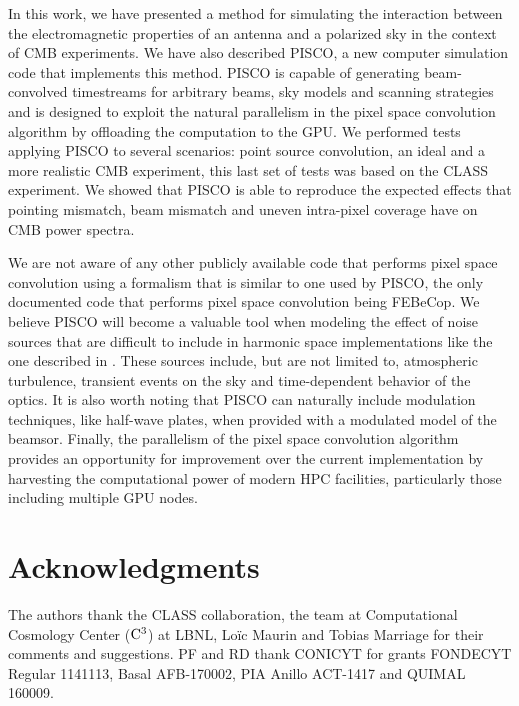 \documentclass[a4paper,11pt]{article}
\begin{document}
In this work, we have presented a method for simulating the interaction between the electromagnetic properties of an antenna and a polarized sky in the context of CMB experiments. We have also described PISCO, a new computer simulation code that implements this method. PISCO is capable of generating beam-convolved timestreams for arbitrary beams, sky models and scanning strategies and is designed to exploit the natural parallelism in the pixel space convolution algorithm by offloading the computation to the GPU. We performed tests applying PISCO to several scenarios: point source convolution, an ideal and a more realistic CMB experiment, this last set of tests was based on the CLASS experiment. We showed that PISCO is able to reproduce the expected effects that pointing mismatch, beam mismatch and uneven intra-pixel coverage have on CMB power spectra. 

We are not aware of any other publicly available code that performs pixel space convolution using a formalism that is similar to one used by PISCO, the only documented code that performs pixel space convolution being FEBeCop. We believe PISCO will become a valuable tool when modeling the effect of noise sources that are difficult to include in harmonic space implementations like the one described in \cite{2018arXiv180905034D}. These sources include, but are not limited to, atmospheric turbulence, transient events on the sky and time-dependent behavior of the optics. It is also worth noting that PISCO can naturally include modulation techniques, like half-wave plates, when provided with a modulated model of the beamsor. Finally, the parallelism of the pixel space convolution algorithm provides an opportunity for improvement over the current implementation by harvesting the computational power of modern HPC facilities, particularly those including multiple GPU nodes.

\section{Acknowledgments}

The authors thank the CLASS collaboration, the team at Computational Cosmology Center ($\rm{C}^3$) at LBNL, Lo\"ic Maurin and Tobias Marriage for their comments and suggestions. PF and RD thank CONICYT for grants FONDECYT Regular 1141113, Basal AFB-170002, PIA Anillo ACT-1417 and QUIMAL 160009.

\end{document}
